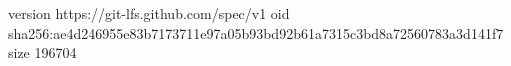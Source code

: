 version https://git-lfs.github.com/spec/v1
oid sha256:ae4d246955e83b7173711e97a05b93bd92b61a7315c3bd8a72560783a3d141f7
size 196704
